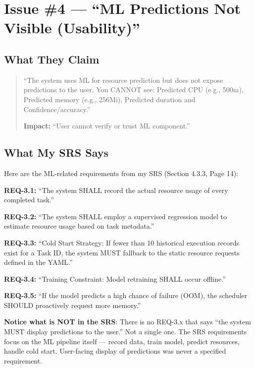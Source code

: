 \documentclass[12pt,a4paper]{article}
\begin{document}
\newpage

\section{Issue \#4 --- ``ML Predictions Not Visible (Usability)''}

\subsection{What They Claim}

\begin{quote}
``The system uses ML for resource prediction but does not expose predictions to the user. You CANNOT see: Predicted CPU (e.g., 500m), Predicted memory (e.g., 256Mi), Predicted duration and Confidence/accuracy.''

\textbf{Impact:} ``User cannot verify or trust ML component.''
\end{quote}

\subsection{What My SRS Says}

\begin{srsbox}
Here are the ML-related requirements from my SRS (Section 4.3.3, Page 14):

\textbf{REQ-3.1:} ``The system SHALL record the actual resource usage of every completed task.''

\textbf{REQ-3.2:} ``The system SHALL employ a supervised regression model to estimate resource usage based on task metadata.''

\textbf{REQ-3.3:} ``Cold Start Strategy: If fewer than 10 historical execution records exist for a Task ID, the system MUST fallback to the static resource requests defined in the YAML.''

\textbf{REQ-3.4:} ``Training Constraint: Model retraining SHALL occur offline.''

\textbf{REQ-3.5:} ``If the model predicts a high chance of failure (OOM), the scheduler SHOULD proactively request more memory.''

\textbf{Notice what is NOT in the SRS}: There is no REQ-3.x that says ``the system MUST display predictions to the user.'' Not a single one. The SRS requirements focus on the ML pipeline itself --- record data, train model, predict resources, handle cold start. User-facing display of predictions was never a specified requirement.
\end{srsbox}
\end{document}
